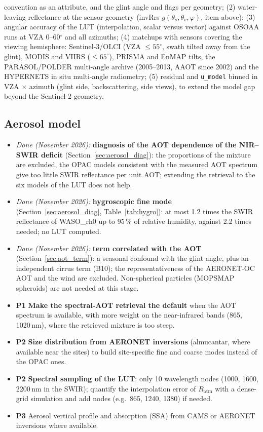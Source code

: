 \documentclass[11pt,a4paper]{article}
\newcommand{\code}[1]{\texttt{#1}}
\newcommand{\prio}[1]{\textbf{\textcolor{blue!50!black}{#1}}}
\begin{document}
\begin{itemize}
  convention as an attribute, and the glint angle and flags per geometry; (2) water-leaving reflectance at the
  sensor geometry (invRrs $g(\theta_s,\theta_v,\varphi)$, item above); (3) angular accuracy of the LUT (interpolation,
  scalar versus vector) against OSOAA runs at VZA 0--60$^\circ$ and all azimuths; (4) matchups with sensors covering
  the viewing hemisphere: Sentinel-3/OLCI (VZA $\leq55^\circ$, swath tilted away from the glint), MODIS and VIIRS
  ($\leq65^\circ$), PRISMA and EnMAP tilts, the PARASOL/POLDER multi-angle archive (2005--2013, AAOT since 2002) and the
  HYPERNETS in situ multi-angle radiometry; (5) residual and \code{u\_model} binned in VZA $\times$ azimuth (glint
  side, backscattering, side views), to extend the model gap beyond the Sentinel-2 geometry.
\end{itemize}

\subsection{Aerosol model}
\begin{itemize}
\item \textit{Done (November 2026):} \textbf{diagnosis of the AOT dependence of the NIR--SWIR deficit}
  (Section~\ref{sec:aerosol_diag}): the proportions of the mixture are excluded, the OPAC models consistent with the
  measured AOT spectrum give too little SWIR reflectance per unit AOT; extending the retrieval to the six models of
  the LUT does not help.
\item \textit{Done (November 2026):} \textbf{hygroscopic fine mode} (Section~\ref{sec:aerosol_diag},
  Table~\ref{tab:hygro}): at most 1.2 times the SWIR reflectance of WASO\_rh0 up to 95\,\% of relative humidity,
  against 2.2 times needed; no LUT computed.
\item \textit{Done (November 2026):} \textbf{term correlated with the AOT} (Section~\ref{sec:aot_term}): a seasonal
  confound with the glint angle, plus an independent cirrus term (B10); the representativeness of the AERONET-OC
  AOT and the wind are excluded. Non-spherical particles (MOPSMAP spheroids) are not needed at this stage.
\item \prio{P1} \textbf{Make the spectral-AOT retrieval the default} when the AOT spectrum is available, with more
  weight on the near-infrared bands (865, 1020\,nm), where the retrieved mixture is too steep.
\item \prio{P2} \textbf{Size distribution from AERONET inversions} (almucantar, where available near the sites) to
  build site-specific fine and coarse modes instead of the OPAC ones.
\item \prio{P2} \textbf{Spectral sampling of the LUT}: only 10 wavelength nodes (1000, 1600, 2200\,nm in the SWIR);
  quantify the interpolation error of $R_\mathrm{atm}$ with a dense-grid simulation and add nodes (e.g.\ 865,
  1240, 1380) if needed.
\item \prio{P3} Aerosol vertical profile and absorption (SSA) from CAMS or AERONET inversions where available.
\end{itemize}
\end{document}
